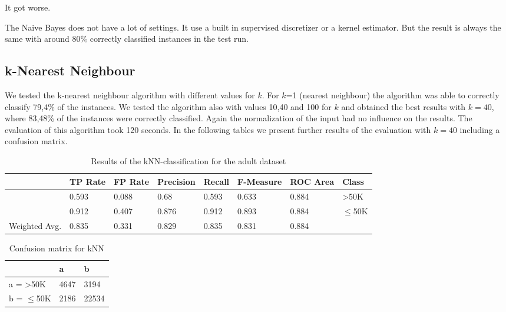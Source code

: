 \documentclass[paper=a4, fontsize=11pt]{scrartcl} %
\numberwithin{equation}{section} %
\numberwithin{figure}{section} %
\numberwithin{table}{section} %
\begin{document}
It got worse. 

The Naive Bayes does not have a lot of settings. It use a built in supervised discretizer or a kernel estimator. But the result is always the same with around 80\% correctly classified instances in the test run.

\subsection{k-Nearest Neighbour}

We tested the k-nearest neighbour algorithm with different values for $k$. For $k$=1 (nearest neighbour) the algorithm was able to correctly classify 79,4\% of the instances. We tested the algorithm also with values 10,40 and 100 for $k$ and obtained the best results with $k=40$, where 83,48\% of the instances were correctly classified. Again the normalization of the input had no influence on the results. The evaluation of this algorithm took 120 seconds. In the following tables we present further results of the evaluation with $k=40$ including a confusion matrix.

\begin{table}[h]
\centering
\begin{tabular}{|llllllll|}
	\hline
									&TP Rate   &FP Rate   &Precision   &Recall  &F-Measure &ROC Area  	&Class\\
	\hline
									&0.593     &0.088      &0.68      &0.593     &0.633    &0.884    		&>50K\\
									&0.912     &0.407      &0.876     &0.912     &0.893    &0.884    		&$\leq$50K\\
  \hline
	Weighted Avg.   &0.835     &0.331      &0.829     &0.835     &0.831    &0.884 \\
	\hline
\end{tabular}
\caption{Results of the kNN-classification for the adult dataset}
\end{table}

\vspace{6pt}

\begin{table}[h]
\centering
\begin{tabular}{|l|ll|}
	\hline
	 &              a    & b     \\
	\hline
    a = >50K      &	4647 & 3194  \\
    b = $\leq$50K & 2186 & 22534 \\
    \hline
\end{tabular}
\caption{Confusion matrix for kNN}
\end{table}
\end{document}
